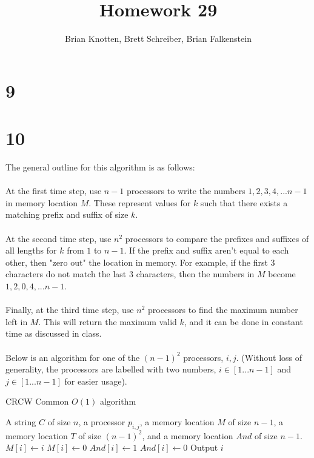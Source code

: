 \documentclass[letterpaper,notitlepage,twoside]{article}
\begin{document}
\title{Homework 29}
\author{Brian Knotten, Brett Schreiber, Brian Falkenstein}
\maketitle

\section*{9}

\section*{10}
The general outline for this algorithm is as follows:
\\\\
At the first time step, use $n - 1$ processors to write the numbers $1, 2, 3, 4, ... n - 1$ in memory location $M$. These represent values for $k$ such that there exists a matching prefix and suffix of size $k$.
\\\\
At the second time step, use $n^2$ processors to compare the prefixes and suffixes of all lengths for $k$ from $1$ to $n - 1$. If the prefix and suffix aren't equal to each other, then "zero out" the location in memory. For example, if the first 3 characters do not match the last 3 characters, then the numbers in $M$ become $1, 2, 0, 4, ... n -1$.
\\\\
Finally, at the third time step, use $n^2$ processors to find the maximum number left in $M$. This will return the maximum valid $k$, and it can be done in constant time as discussed in class.
\\\\
Below is an algorithm for one of the $(n - 1)^2$ processors, $i, j$. (Without loss of generality, the processors are labelled with two numbers, $i \in [1...n-1]$ and $j \in [1...n-1]$ for easier usage).

\begin{algorithm}
    \begin{algorithmic}%
        \caption{CRCW Common $O(1)$ algorithm}
        \Require A string $C$ of size $n$, a processor $p_{i, j}$, a memory location $M$ of size $n - 1$, a memory location $T$ of size $(n - 1)^2$, and a memory location $And$ of size $n - 1$.
        \State $M[i] \gets i$ 
            \State $M[i] \gets 0$ 
        \EndIf
        \State $And[i] \gets 1$ 
         
            \State $And[i] \gets 0$ 
        \EndIf
            \State Output $i$ 
        \EndIf
    \end{algorithmic}
\end{algorithm}
\end{document}
